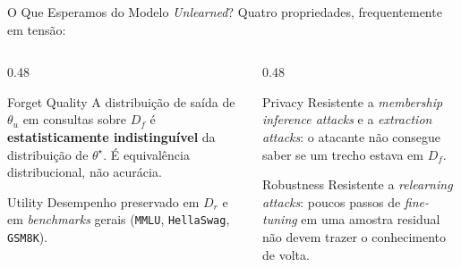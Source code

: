 \documentclass[aspectratio=169,xcolor=dvipsnames]{beamer}
\begin{document}
  \begin{frame}{O Que Esperamos do Modelo \textit{Unlearned}?}
    Quatro propriedades, frequentemente em tensão:
    \vspace{0.3em}
    \begin{columns}[T]
      \begin{column}{0.48\textwidth}
        \begin{block}{Forget Quality}
          A distribuição de saída de $\theta_u$ em consultas sobre $D_f$ é \textbf{estatisticamente indistinguível} da distribuição de $\theta^\star$. É equivalência distribucional, não acurácia.
        \end{block}
        \begin{block}{Utility}
          Desempenho preservado em $D_r$ e em \textit{benchmarks} gerais (\texttt{MMLU}, \texttt{HellaSwag}, \texttt{GSM8K}).
        \end{block}
      \end{column}
      \begin{column}{0.48\textwidth}
        \begin{block}{Privacy}
          Resistente a \textit{membership inference attacks} e a \textit{extraction attacks}: o atacante não consegue saber se um trecho estava em $D_f$.
        \end{block}
        \begin{alertblock}{Robustness}
          Resistente a \textit{relearning attacks}: poucos passos de \textit{fine-tuning} em uma amostra residual não devem trazer o conhecimento de volta.
        \end{alertblock}
      \end{column}
    \end{columns}
  \end{frame}
\end{document}

